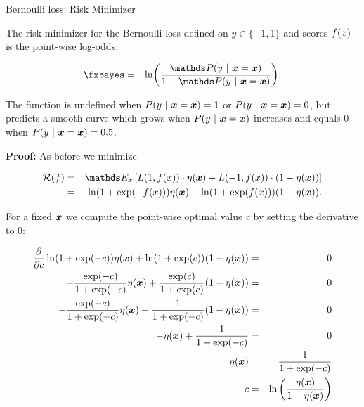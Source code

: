 \begin{vbframe}{Bernoulli loss: Risk Minimizer}
\begin{footnotesize}
\end{footnotesize}

\framebreak 

The risk minimizer for the Bernoulli loss defined on $y \in \{-1, 1\}$ and scores $f(x)$ is the point-wise log-odds:

\begin{eqnarray*}
\fxbayes &=&  \ln \biggl(\frac{\P(y~|~\xv = \xv)}{1-\P(y~|~\xv = \xv)}\biggr).
\end{eqnarray*}

The function is undefined when $P(y~|~\bm{x} = \bm{x}) = 1$ or $P(y~|~\bm{x} = \bm{x}) = 0$, but predicts a smooth curve which grows when $P(y~|~\bm{x} = \bm{x})$ increases and equals $0$ when $P(y~|~\bm{x} = \bm{x}) = 0.5$.

\lz 

\textbf{Proof: } As before we minimize 

\begin{eqnarray*}
  \riskf &=& \E_x \left[L(1, \fx) \cdot \eta(\xv) + L(-1, \fx) \cdot (1 - \eta(\xv)) \right] \\
  &=&  \ln(1 + \exp(- \fx)) \eta(\xv)+ \ln(1 + \exp(\fx)) (1 - \eta(\xv)). 
\end{eqnarray*}

\framebreak 

For a fixed $\bm{x}$ we compute the point-wise optimal value $c$ by setting the derivative to $0$: 


\begin{footnotesize}
  \begin{eqnarray*}
  \frac{\partial }{\partial c} \ln(1 + \exp(-c)) \eta(\bm{x})+ \ln(1 + \exp(c)) (1 - \eta(\bm{x})) &=& 0 \\
  - \frac{\exp(-c)}{1 + \exp(-c)} \eta(\bm{x}) + \frac{\exp(c)}{1 + \exp(c)} (1 - \eta(\bm{x})) &=& 0 \\ 
   - \frac{\exp(-c)}{1 + \exp(-c)} \eta(\bm{x}) + \frac{1}{1 + \exp(- c)} (1 - \eta(\bm{x})) &=& 0\\ 
  - \eta(\bm{x}) + \frac{1}{1 + \exp(-c)} &=& 0\\
  \eta(\bm{x}) &=& \frac{1}{1 + \exp(-c)} \\
   c &=& \ln\left(\frac{\eta(\bm{x})}{1 - \eta(\bm{x})}\right)
  \end{eqnarray*}
\end{footnotesize}

\end{vbframe}



